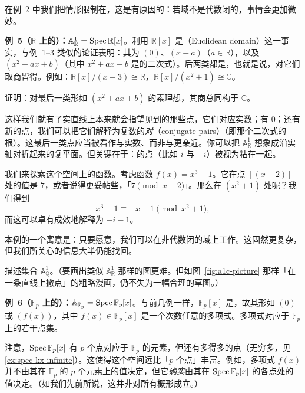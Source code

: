 在例~2 中我们把情形限制在\trAlgClosedField，这是有原因的：若域不是代数闭的，事情会更加微妙。

\textbf{例~5（$\mathbb{R}$ 上的\trAffineLine）：}$\mathbb{A}^1_{\mathbb{R}}=\operatorname{Spec}\mathbb{R}[x]$。利用 $\mathbb{R}[x]$ 是\textbf{\trEuclideanDomain}（Euclidean domain）这一事实，与例~1--3 类似的论证表明：其\trPrimeIdeal{}为 $(0)$、$(x-a)$（$a\in\mathbb{R}$），以及 $(x^2+ax+b)$（其中 $x^2+ax+b$ 是\trIrreducible{}的二次式）。后两类都是\trMaximalIdeal，也就是说，对它们取商皆得\trField。例如：$\mathbb{R}[x]/(x-3)\cong\mathbb{R}$，$\mathbb{R}[x]/(x^2+1)\cong\mathbb{C}$。

\begin{exercise}[不重要练习]\label{ex:irreducible-quadratic-quotient-c}
证明：对最后一类形如 $(x^2+ax+b)$ 的素理想，其商总同构于 $\mathbb{C}$。
\end{exercise}

这样我们就有了实直线上本来就会指望见到的那些点，它们对应实数；有\trGenericPoint{} $0$；还有新的点，我们可以把它们解释为复数的\emph{\trConjugate{}对}（conjugate pairs）（即那个二次式的根）。这最后一类点应当被看作与实数、而非与\trGenericPoint{}更亲近。你可以把 $\mathbb{A}^1_{\mathbb{R}}$ 想象成沿实轴对折起来的复平面。但关键在于：\trGalois{}\trConjugate{}的点（比如 $i$ 与 $-i$）被视为粘在一起。

我们来探索这个空间上的函数。考虑函数 $f(x)=x^3-1$。它在点 $[(x-2)]$ 处的值是 $7$，或者说得更妥帖些，「$7\pmod{x-2}$」。那么在 $(x^2+1)$ 处呢？我们得到
\[
x^3-1\equiv -x-1\pmod{x^2+1},
\]
而这可以卓有成效地解释为 $-i-1$。

本例的一个寓意是：只要愿意，我们可以在非代数闭的域上工作。这固然更复杂，但我们所关心的信息大半仍能找回。

\begin{exercise}[重要练习]\label{ex:affine-line-over-q}
描述集合 $\mathbb{A}^1_{\mathbb{Q}}$。（要画出类似 $\mathbb{A}^1_{\mathbb{R}}$ 那样的图更难。但如图~\ref{fig:a1c-picture} 那样「在一条直线上撒点」的粗略漫画，仍不失为一幅合理的草图。）
\end{exercise}

\textbf{例~6（$\mathbb{F}_p$ 上的\trAffineLine）：}$\mathbb{A}^1_{\mathbb{F}_p}=\operatorname{Spec}\mathbb{F}_p[x]$。与前几例一样，$\mathbb{F}_p[x]$ 是\trEuclideanDomain，故其\trPrimeIdeal{}形如 $(0)$ 或 $(f(x))$，其中 $f(x)\in\mathbb{F}_p[x]$ 是一个次数任意的\trIrreducible{}多项式。\trIrreducible{}多项式对应于 $\mathbb{F}_p$ 上的若干\trGalois{}\trConjugate{}点集。

注意，$\operatorname{Spec}\mathbb{F}_p[x]$ 有 $p$ 个点对应于 $\mathbb{F}_p$ 的元素，但还有多得多的点（无穷多，见\cref{ex:spec-kx-infinite}）。这使得这个空间远比「$p$ 个点」丰富。例如，多项式 $f(x)$ 并不由其在 $\mathbb{F}_p$ 的 $p$ 个元素上的值决定，但它\emph{确实}由其在 $\operatorname{Spec}\mathbb{F}_p[x]$ 的各点处的值决定。（如我们先前所说，这并非对所有概形成立。）

